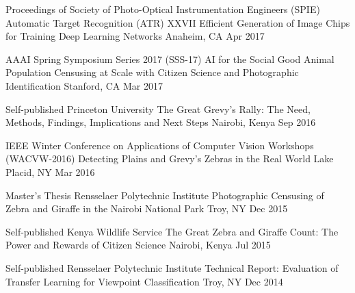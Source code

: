 

\begin{cventries}

  \cventry
    {Proceedings of Society of Photo-Optical Instrumentation Engineers (SPIE) \dotSep Automatic Target Recognition (ATR) XXVII} %
    {Efficient Generation of Image Chips for Training Deep Learning Networks} %
    {Anaheim, CA} %
    {Apr 2017} %

  \cventry
    {AAAI Spring Symposium Series 2017 (SSS-17) \dotSep AI for the Social Good} %
    {Animal Population Censusing at Scale with Citizen Science and Photographic Identification} %
    {Stanford, CA} %
    {Mar 2017} %

  \cventryshort
    {Self-published \dotSep Princeton University} %
    {The Great Grevy’s Rally: The Need, Methods, Findings, Implications and Next Steps} %
    {Nairobi, Kenya} %
    {Sep 2016} %

  \cventryshort
    {IEEE Winter Conference on Applications of Computer Vision Workshops (WACVW-2016)} %
    {Detecting Plains and Grevy's Zebras in the Real World} %
    {Lake Placid, NY} %
    {Mar 2016} %

  \cventryshort
    {Master's Thesis \dotSep Rensselaer Polytechnic Institute} %
    {Photographic Censusing of Zebra and Giraffe in the Nairobi National Park} %
    {Troy, NY} %
    {Dec 2015} %

  \cventryshort
    {Self-published \dotSep Kenya Wildlife Service} %
    {The Great Zebra and Giraffe Count: The Power and Rewards of Citizen Science} %
    {Nairobi, Kenya} %
    {Jul 2015} %

  \cventryshort
    {Self-published \dotSep Rensselaer Polytechnic Institute} %
    {Technical Report: Evaluation of Transfer Learning for Viewpoint Classification} %
    {Troy, NY} %
    {Dec 2014} %


\end{cventries}
